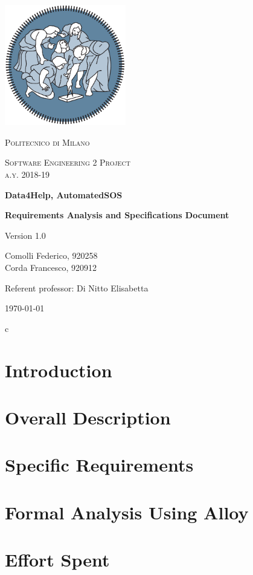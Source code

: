 \documentclass{report}
\author{Federico Comolli
        \and
        Francesco Corda}
\date{October 2018}
\begin{document}
\begin{titlepage}
	\centering
	\includegraphics[width=150pt]{images/polimi_logo}\par\vspace{1cm}
	{\scshape\LARGE
		Politecnico di Milano\par}
	\vspace{1cm}
	{\scshape\Large
		Software Engineering 2 Project\\
		a.y. 2018-19\par}
	\vspace{1.5cm}
	{\huge\bfseries
		Data4Help, AutomatedSOS\\\par}
	{\Large\bfseries
		Requirements Analysis and Specifications Document\par}
	Version 1.0\par
	\vspace{2cm}
	{\Large
		Comolli Federico, 920258\\
	    Corda Francesco, 920912\par}
	\vfill
	Referent professor: Di Nitto Elisabetta\par
	\vfill
	{\large\today\par}
\end{titlepage}


\renewcommand{\contentsname}{Table of Contents}
\tableofcontents


c\chapter{Introduction}


\chapter{Overall Description}


\chapter{Specific Requirements}


\chapter{Formal Analysis Using Alloy}


\chapter{Effort Spent}
 



\end{document}
